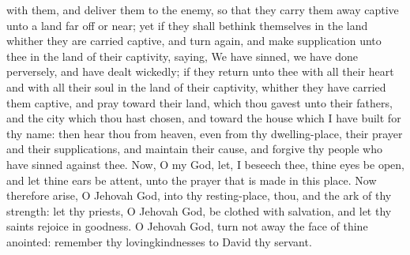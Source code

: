 with them, and deliver them to the enemy, so that they carry them away captive unto a land far off or near; yet if they shall bethink themselves in the land whither they are carried captive, and turn again, and make supplication unto thee in the land of their captivity, saying, We have sinned, we have done perversely, and have dealt wickedly; if they return unto thee with all their heart and with all their soul in the land of their captivity, whither they have carried them captive, and pray toward their land, which thou gavest unto their fathers, and the city which thou hast chosen, and toward the house which I have built for thy name: then hear thou from heaven, even from thy dwelling-place, their prayer and their supplications, and maintain their cause, and forgive thy people who have sinned against thee.  Now, O my God, let, I beseech thee, thine eyes be open, and let thine ears be attent, unto the prayer that is made in this place. Now therefore arise, O Jehovah God, into thy resting-place, thou, and the ark of thy strength: let thy priests, O Jehovah God, be clothed with salvation, and let thy saints rejoice in goodness. O Jehovah God, turn not away the face of thine anointed: remember thy lovingkindnesses to David thy servant. 

